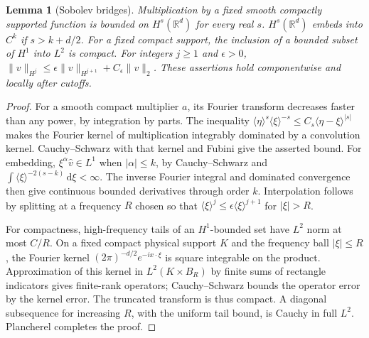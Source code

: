 \documentclass[11pt]{article}
\newcommand{\R}{\mathbb R}
\newcommand{\dd}{\mathrm d}
\newtheorem{lemma}[theorem]{Lemma}
\theoremstyle{remark}
\numberwithin{equation}{section}
\begin{document}
\begin{lemma}[Sobolev bridges]\label{lem:sobolev-background}
Multiplication by a fixed smooth compactly supported function is bounded on
$H^s(\R^d)$ for every real $s$. $H^s(\R^d)$ embeds into $C^k$ if
$s>k+d/2$. For a fixed compact support, the inclusion of a bounded subset
of $H^1$ into $L^2$ is compact. For integers $j\ge1$ and $\epsilon>0$,
$\|v\|_{H^j}\le\epsilon\|v\|_{H^{j+1}}+C_\epsilon\|v\|_2$.
These assertions hold componentwise and locally after cutoffs.
\end{lemma}
\begin{proof}
For a smooth compact multiplier $a$, its Fourier transform decreases faster
than any power, by integration by parts. The inequality
$\langle\eta\rangle^s\langle\xi\rangle^{-s}
\le C_s\langle\eta-\xi\rangle^{|s|}$ makes the Fourier kernel of
multiplication integrably dominated by a convolution kernel. Cauchy--Schwarz
with that kernel and Fubini give the asserted bound. For embedding,
$\xi^\alpha\widehat v\in L^1$ when $|\alpha|\le k$, by Cauchy--Schwarz
and $\int\langle\xi\rangle^{-2(s-k)}\,\dd\xi<\infty$.
The inverse Fourier integral and dominated convergence then give continuous
bounded derivatives through order $k$. Interpolation follows by splitting
at a frequency $R$ chosen so that
$\langle\xi\rangle^{j}\le\epsilon\langle\xi\rangle^{j+1}$ for
$|\xi|>R$.

For compactness, high-frequency tails of an $H^1$-bounded set have $L^2$
norm at most $C/R$. On a fixed compact physical support $K$ and the
frequency ball $|\xi|\le R$, the Fourier kernel
$(2\pi)^{-d/2}e^{-ix\cdot\xi}$ is square integrable on the product.
Approximation of this kernel in $L^2(K\times B_R)$ by finite sums of
rectangle indicators gives finite-rank operators; Cauchy--Schwarz bounds
the operator error by the kernel error. The truncated transform is thus
compact. A diagonal subsequence for increasing $R$, with the uniform tail
bound, is Cauchy in full $L^2$. Plancherel completes the proof.
\end{proof}
\end{document}
